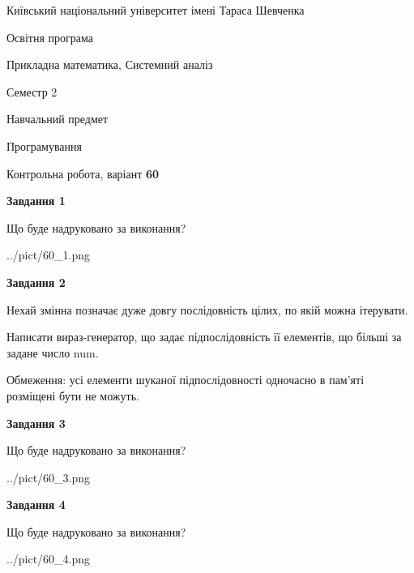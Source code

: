 \documentclass[12pt, ukrainian]{article}
\begin{document}
{{\begin {small}\par
{ \center  Київський національний університет імені Тараса Шевченка \par}
{\parbox {5 cm}{Освітня програма \hfill}{\parbox {8 cm}{Прикладна математика, Системний аналіз \hfill}}\parbox {5 cm}{\hfill Семестр 2}}\par
{\parbox {5 cm} {Навчальний предмет \hfill}\parbox {7 cm}{Програмування \hfill}\parbox {6cm}{\hfill}\par}\vspace{-7pt} \end{small}}{\center Контрольна робота, варіант  \No \textbf
{ 60 }\par}}
{
\begin {large}
{\begin {center}\textbf{Завдання 1}\end {center}}\par
Що буде надруковано за виконання?\par\par
\begin{center}
	{../pict/60_1.png}
\end{center}
\newpage

{\begin {center}\textbf{Завдання 2}\end {center}}\par
Нехай змінна  позначає дуже довгу послідовність цілих, по якій можна ітерувати.

Написати вираз-генератор, що задає підпослідовність її елементів, що більші за задане число num.

Обмеження: усі елементи шуканої підпослідовності одночасно в пам'яті розміщені бути не можуть.\par
\newpage

{\begin {center}\textbf{Завдання 3}\end {center}}\par
Що буде надруковано за виконання?\par
\begin{center}
	{../pict/60_3.png}
\end{center}
\newpage

{\begin {center}\textbf{Завдання 4}\end {center}}\par
Що буде надруковано за виконання?\par
\begin{center}
	{../pict/60_4.png}
\end{center}
\newpage


\end{large}}
\end{document}
